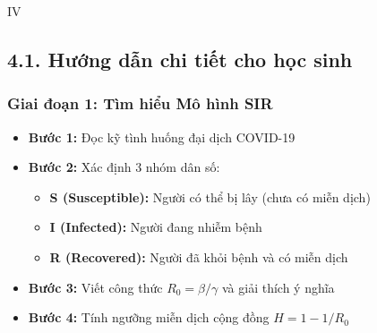 \documentclass[12pt,a4paper]{article}
\begin{document}
\begin{competitionsection}{IV}
\vspace{0.5cm}
\subsection*{4.1. Hướng dẫn chi tiết cho học sinh}
\subsubsection*{Giai đoạn 1: Tìm hiểu Mô hình SIR}
\begin{itemize}[leftmargin=*,noitemsep]
\item \textbf{Bước 1:} Đọc kỹ tình huống đại dịch COVID-19
\item \textbf{Bước 2:} Xác định 3 nhóm dân số:
    \begin{itemize}
    \item \textbf{S (Susceptible):} Người có thể bị lây (chưa có miễn dịch)
    \item \textbf{I (Infected):} Người đang nhiễm bệnh
    \item \textbf{R (Recovered):} Người đã khỏi bệnh và có miễn dịch
    \end{itemize}
\item \textbf{Bước 3:} Viết công thức $R_0 = \beta / \gamma$ và giải thích ý nghĩa
\item \textbf{Bước 4:} Tính ngưỡng miễn dịch cộng đồng $H = 1 - 1/R_0$
\end{itemize}


\end{competitionsection}
\end{document}
